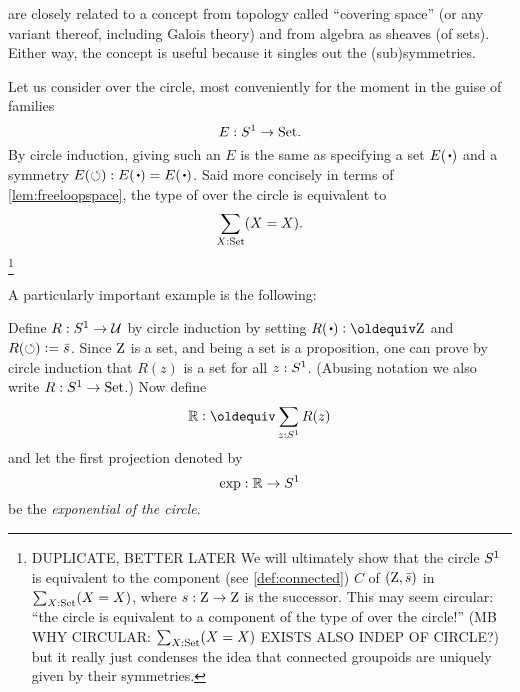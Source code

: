 \begin{remark}
  \Coverings are closely related to a concept from topology called ``covering space'' (or any variant thereof, including Galois theory) and from algebra as sheaves (of sets).  Either way, the concept is useful because it singles out the (sub)symmetries.  
\end{remark}



\begin{example}\label{xca:coveringsofS1}
Let us consider \coverings over the circle, most conveniently 
for the moment in the guise of families 
$$E:{S^1}\to\mathord{\mathrm{Set}}.$$
By circle induction, giving such an $E$ is the same as 
specifying a set $E(\base)$ and a symmetry $E(\Sloop):E(\base)=E(\base)$.  
Said more concisely in terms of \cref{lem:freeloopspace}, 
the type of \coverings over the circle is equivalent to 
$$\sum_{X:\mathord{\mathrm{Set}}}(X=X).$$ \footnote{\color{blue}%
DUPLICATE, BETTER LATER
We will ultimately show that the circle ${S^1}$ is equivalent to the 
component (see \cref{def:connected}) $C$ of $(\mathrm{Z},\bar {s})$ in $\sum_{X:\mathord{\mathrm{Set}}}(X=X)$,  
where $s:\mathrm{Z}\to\mathrm{Z}$ is the successor.  This may seem circular: ``the circle is equivalent to a component of the type of \coverings over the circle!'' 
(MB WHY CIRCULAR: $\sum_{X:\mathord{\mathrm{Set}}}(X=X)$ EXISTS ALSO INDEP OF CIRCLE?)
but it really just condenses the idea that connected groupoids are uniquely 
given by their symmetries.}
\end{example}
A particularly important example is the following:
\begin{definition}\label{def:RtoS1}
Define $R:{S^1}\to\mathcal{U}$ by circle induction by setting 
$R(\base)\defeq\zet$ and $R(\circlearrowleft)\vcentcolon= \bar {s}$.
Since $\mathrm{Z}$ is a set, and being a set is a proposition,
one can prove by circle induction that $R(z)$ is a set for all $z:{S^1}$.
(Abusing notation we also write $R:{S^1}\to\mathord{\mathrm{Set}}$.) Now define
$$\RR\defeq\sum_{z:\Sc}R(z)$$
and let the first projection denoted by
$$\exp:\mathbb{R}\to {S^1}$$
be the \emph{exponential \covering of the circle}.
\end{definition}

